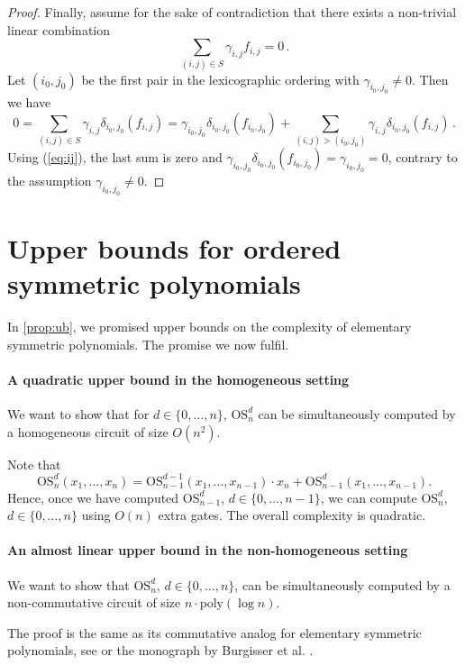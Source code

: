 \documentclass[10pt,a4paper]{article}
\newcommand{\esym}[2]{\mathrm{OS}_{#1}^{#2}}
\begin{document}
\begin{proof}
  Finally, assume for the sake of contradiction that there exists a non-trivial linear combination 
  \[
    \sum_{(i,j)\in S}  \gamma_{i,j} f_{i,j}=0\,.
  \]
  Let $( i_0,j_0)$ be the first pair in the lexicographic ordering with $\gamma_{i_0,j_0} \neq 0$. 
  Then we have
  \[
    0=\sum_{(i,j)\in S}  \gamma_{i,j} \delta_{i_0,j_0}( f_{i,j})=\gamma_{i_0,j_0} \delta_{i_0,j_0}(f_{i_0,j_0})+\sum_{(i,j)> (i_0,j_0)}  \gamma_{i,j} \delta_{i_0,j_0}(f_{i,j})\,.  
  \]
  Using (\ref{eq:ij}), the last sum is zero and  $\gamma_{i_0,j_0} \delta_{i_0,j_0}(f_{i_0,j_0})= \gamma_{i_0,j_0}=0$,  contrary to the assumption  $\gamma_{i_0,j_0}\not =0$.
\end{proof}

\section{Upper bounds for ordered symmetric polynomials}\label{sec:esym}

In \autoref{prop:ub}, we promised upper bounds on the complexity of elementary symmetric polynomials. 
The promise we now fulfil. 

\paragraph*{A quadratic upper bound in the homogeneous setting}

We want to show that for $d\in \{0,\dots, n\}$, $\esym{n}{d}$ can be simultaneously computed by a homogeneous circuit of size $O(n^2)$.
  
Note that %
\[
  \esym{n}{d}(x_1, \ldots, x_n) = \esym{n-1}{d-1}(x_1, \ldots, x_{n-1}) \cdot x_n + \esym{n-1}{d}(x_1, \ldots, x_{n-1}).
\]
Hence, once we have computed $\esym{n-1}{d}$, $d\in \{0,\dots, n-1\}$, we can compute $\esym{n}{d}$, $d\in \{0,\dots, n\}$ using $O(n)$ extra gates. The overall complexity is quadratic.


\paragraph*{An almost linear upper bound in the non-homogeneous setting}

We want to show that $\esym{n}{d}$, $d\in \{0,\dots, n\}$, can be simultaneously computed by a non-commutative circuit of size $n\cdot \mathrm{poly}(\log n)$. 

The proof is the same as its commutative analog for elementary symmetric polynomials, see \cite{BS83} or the monograph by Burgisser et al. \cite[Chapters  2.1-2.3]{BCS97}. 
\end{document}
